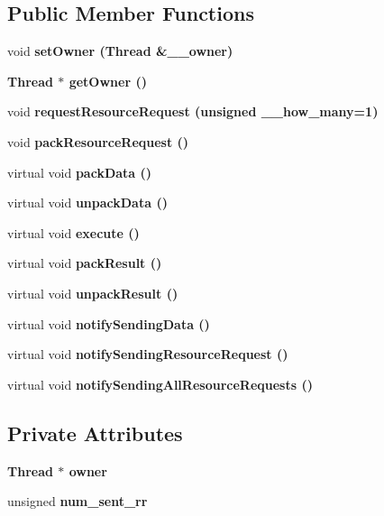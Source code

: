 \subsection*{Public Member Functions}
\begin{CompactItemize}
\item 
void \bf{set\-Owner} (\bf{Thread} \&\_\-\_\-owner)\label{class_service_33b149b98498c0e7e401b0f0839d7f0d}

\item 
\bf{Thread} $\ast$ \bf{get\-Owner} ()\label{class_service_0dae00309c51a7b7069788142aed799f}

\item 
void \bf{request\-Resource\-Request} (unsigned \_\-\_\-how\_\-many=1)\label{class_service_7e2ae35a9070a05dcd46488df649896d}

\item 
void \bf{pack\-Resource\-Request} ()\label{class_service_c4289f98d1cd9ed53e850efbb6a947bd}

\item 
virtual void \bf{pack\-Data} ()\label{class_service_aea4b8f7f8fb88e83862ee4bfd9ab207}

\item 
virtual void \bf{unpack\-Data} ()\label{class_service_3bd87b444710813d30fd754d4d0b4df3}

\item 
virtual void \bf{execute} ()\label{class_service_e4f2894e6121e60f38d41cfbd7447ae4}

\item 
virtual void \bf{pack\-Result} ()\label{class_service_e5e4f90b2315e15c2a2913bd370f4cf5}

\item 
virtual void \bf{unpack\-Result} ()\label{class_service_45c06344edbfa482b91f68e2035a6099}

\item 
virtual void \bf{notify\-Sending\-Data} ()\label{class_service_81ad4d6ebb50045b8977e2ab74826f30}

\item 
virtual void \bf{notify\-Sending\-Resource\-Request} ()\label{class_service_94e2012e76aaae3aa8199250f558d503}

\item 
virtual void \bf{notify\-Sending\-All\-Resource\-Requests} ()\label{class_service_f94cc8a5c2665d4574041737e61e9ffc}

\end{CompactItemize}
\subsection*{Private Attributes}
\begin{CompactItemize}
\item 
\bf{Thread} $\ast$ \bf{owner}\label{class_service_8b615c65c876f342fe8209eb7e36d7b2}

\item 
unsigned \bf{num\_\-sent\_\-rr}\label{class_service_a5b2ad9520bb3710b54348b99acebd58}

\end{CompactItemize}


